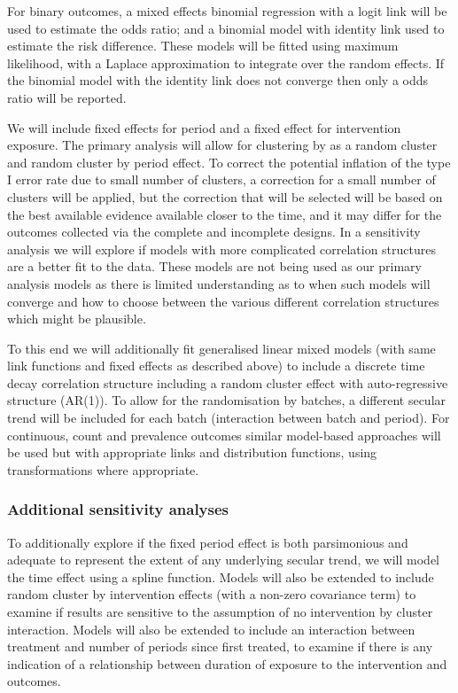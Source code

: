 \documentclass[
]{scrartcl}
\begin{document}
For binary outcomes, a mixed effects binomial regression with a logit
link will be used to estimate the odds ratio; and a binomial model with
identity link used to estimate the risk difference. These models will be
fitted using maximum likelihood, with a Laplace approximation to
integrate over the random effects. If the binomial model with the
identity link does not converge then only a odds ratio will be reported.

We will include fixed effects for period and a fixed effect for
intervention exposure. The primary analysis will allow for clustering by
as a random cluster and random cluster by period effect. To correct the
potential inflation of the type I error rate due to small number of
clusters, a correction for a small number of clusters will be applied,
but the correction that will be selected will be based on the best
available evidence available closer to the time, and it may differ for
the outcomes collected via the complete and incomplete designs. In a
sensitivity analysis we will explore if models with more complicated
correlation structures are a better fit to the data. These models are
not being used as our primary analysis models as there is limited
understanding as to when such models will converge and how to choose
between the various different correlation structures which might be
plausible.

To this end we will additionally fit generalised linear mixed models
(with same link functions and fixed effects as described above) to
include a discrete time decay correlation structure including a random
cluster effect with auto-regressive structure (AR(1)). To allow for the
randomisation by batches, a different secular trend will be included for
each batch (interaction between batch and period). For continuous, count
and prevalence outcomes similar model-based approaches will be used but
with appropriate links and distribution functions, using transformations
where appropriate.

\subsubsection{Additional sensitivity
analyses}\label{additional-sensitivity-analyses}

To additionally explore if the fixed period effect is both parsimonious
and adequate to represent the extent of any underlying secular trend, we
will model the time effect using a spline function. Models will also be
extended to include random cluster by intervention effects (with a
non-zero covariance term) to examine if results are sensitive to the
assumption of no intervention by cluster interaction. Models will also
be extended to include an interaction between treatment and number of
periods since first treated, to examine if there is any indication of a
relationship between duration of exposure to the intervention and
outcomes.
\end{document}
